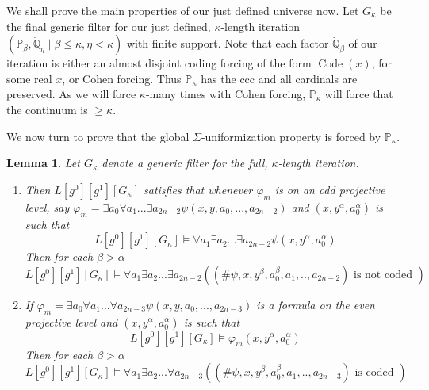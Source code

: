 \documentclass[a4paper,11pt]{article}
\newtheorem{lemma}[theorem]{Lemma}
\newcommand{\forceP}{\mathbb{P}}
\newcommand{\forceQ}{\mathbb{Q}}
\begin{document}
We shall prove the main properties of our just defined universe now.
Let $G_{\kappa}$ be the final generic filter for our just defined, $\kappa$-length iteration $(\forceP_{\beta},\dot{\forceQ}_{\eta} \mid \beta \le \kappa, \eta < \kappa)$ with finite support. Note that each factor $\dot{\forceQ}_{\beta}$ of our iteration is either an almost disjoint coding forcing of the form $\operatorname{Code} (x)$, for some real $x$, or Cohen forcing. Thus $\forceP_{\kappa}$ has the ccc and all cardinals are preserved. As we will force $\kappa$-many times with Cohen forcing, $\forceP_{\kappa}$ will force that the continuum is $\ge \kappa$.

We now turn to prove that the global $\Sigma$-uniformization property is forced by $\forceP_{\kappa}$.

\begin{lemma}
Let $G_{\kappa}$ denote a generic filter for the full, $\kappa$-length iteration.
\begin{enumerate}

\item
Then $L[g^0][g^1][G_{\kappa}]$ satisfies that
whenever $\varphi_m$ is on an odd projective level, say $\varphi_m= \exists a_0 \forall a_1...\exists a_{2n-2} \psi(x,y,a_0,...,a_{2n-2})$ and $(x,y^{\alpha},a_0^{\alpha})$ is such that
\[ L[g^0][g^1][G_{\kappa}] \models \forall a_1 \exists a_2... \exists a_{2n-2} \psi (x,y^{\alpha},a_0^{\alpha}) \]
Then for each $\beta > \alpha$
\[ L[g^0][g^1][G_{\kappa}] \models \forall a_1 \exists a_2...\exists a_{2n-2} ( (\#\psi,x,y^{\beta} ,a_0^{\beta}, a_1,..,a_{2n-2} ) 
\text{ is not coded }) \]
\item If $\varphi_m= \exists a_0 \forall a_1...\forall a_{2n-3} \psi(x,y,a_0,...,a_{2n-3})$ is a formula on the even projective level and $(x,y^{\alpha},a_0^{\alpha})$ is such that
\[ L[g^0][g^1][G_{\kappa}] \models \varphi_m (x,y^{\alpha},a_0^{\alpha}) \]
Then for each $\beta > \alpha$
\[ L[g^0][g^1][G_{\kappa}] \models \forall a_1 \exists a_2...\forall a_{2n-3} ( (\#\psi, x,y^{\beta} ,a_0^{\beta}, a_1,..,a_{2n-3} ) 
\text{ is coded }) \]
\end{enumerate}

\end{lemma}
\end{document}

